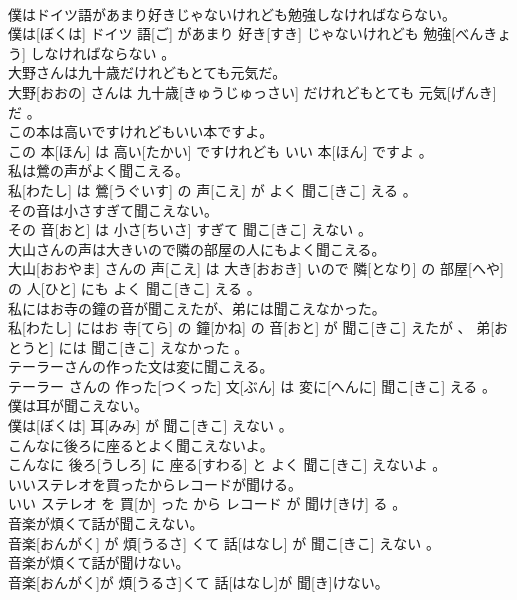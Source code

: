 \documentclass[8pt]{extreport}
\begin{document}
\begin{CJK}{UTF8}{min}
\\	僕はドイツ語があまり好きじゃないけれども勉強しなければならない。	
\\	僕は[ぼくは] ドイツ 語[ご] があまり 好き[すき] じゃないけれども 勉強[べんきょう] しなければならない 。
\\	大野さんは九十歳だけれどもとても元気だ。	
\\	大野[おおの] さんは 九十歳[きゅうじゅっさい] だけれどもとても 元気[げんき] だ 。
\\	この本は高いですけれどもいい本ですよ。	
\\	この 本[ほん] は 高い[たかい] ですけれども いい 本[ほん] ですよ 。
\\	私は鶯の声がよく聞こえる。	
\\	私[わたし] は 鶯[うぐいす] の 声[こえ] が よく 聞こ[きこ] える 。
\\	その音は小さすぎて聞こえない。	
\\	その 音[おと] は 小さ[ちいさ] すぎて 聞こ[きこ] えない 。
\\	大山さんの声は大きいので隣の部屋の人にもよく聞こえる。	
\\	大山[おおやま] さんの 声[こえ] は 大き[おおき] いので 隣[となり] の 部屋[へや] の 人[ひと] にも よく 聞こ[きこ] える 。
\\	私にはお寺の鐘の音が聞こえたが、弟には聞こえなかった。	
\\	私[わたし] にはお 寺[てら] の 鐘[かね] の 音[おと] が 聞こ[きこ] えたが 、 弟[おとうと] には 聞こ[きこ] えなかった 。
\\	テーラーさんの作った文は変に聞こえる。	
\\	テーラー さんの 作った[つくった] 文[ぶん] は 変に[へんに] 聞こ[きこ] える 。
\\	僕は耳が聞こえない。	
\\	僕は[ぼくは] 耳[みみ] が 聞こ[きこ] えない 。
\\	こんなに後ろに座るとよく聞こえないよ。	
\\	こんなに 後ろ[うしろ] に 座る[すわる] と よく 聞こ[きこ] えないよ 。
\\	いいステレオを買ったからレコードが聞ける。	
\\	いい ステレオ を 買[か] った から レコード が 聞け[きけ] る 。
\\	音楽が煩くて話が聞こえない。	
\\	音楽[おんがく] が 煩[うるさ] くて 話[はなし] が 聞こ[きこ] えない 。
\\	音楽が煩くて話が聞けない。	
\\	音楽[おんがく]が 煩[うるさ]くて 話[はなし]が 聞[き]けない。

\end{CJK}
\end{document}
